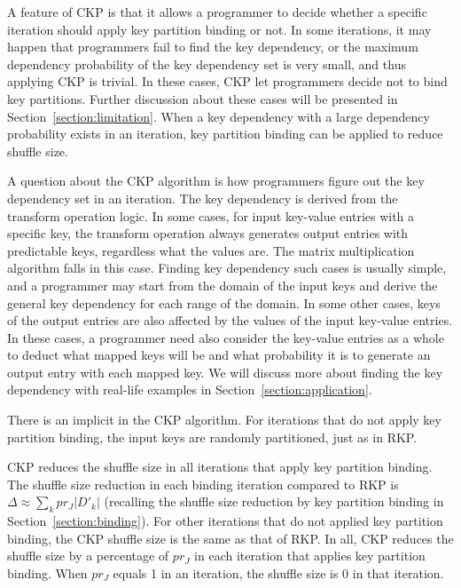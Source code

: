 \documentclass[10pt,journal,compsoc]{IEEEtran}
\begin{document}
A feature of CKP is that it allows a programmer to decide whether a specific iteration should apply key partition binding or not. 
In some iterations, it may happen that programmers fail to find the key dependency, 
or the maximum dependency probability of the key dependency set is very small, 
and thus applying CKP is trivial. 
In these cases, CKP let programmers decide not to bind key partitions. 
Further discussion about these cases will be presented in Section~\ref{section:limitation}.
When a key dependency with a large dependency probability exists in an iteration, key partition binding can be applied to reduce shuffle size.

A question about the CKP algorithm is how programmers figure out the key dependency set in an iteration. 
The key dependency is  derived from the transform operation logic. 
In some cases, for input key-value entries with a specific key, 
the transform operation always generates output entries with predictable keys, 
regardless what the values are. 
The matrix multiplication algorithm falls in this case. 
Finding key dependency such cases is usually simple, 
and a programmer may start from the domain of the input keys and 
derive the general key dependency for each range of the domain.
In some other cases, keys of the output entries are also affected by 
the values of the input key-value entries. 
In these cases, a programmer need also consider the key-value entries as 
a whole to deduct what mapped keys will be and what probability it is
to generate an output entry with each mapped key.
We will discuss more about finding the key dependency with real-life examples in Section~\ref{section:application}.

There is an implicit in the CKP algorithm. 
For iterations that do not apply key partition binding, 
the input keys are randomly partitioned, just as in RKP.

CKP reduces the shuffle size in all iterations that apply key partition binding.
The shuffle size reduction in each binding iteration compared to RKP is $ \Delta \approx \sum_k pr_J |D'_k|$ (recalling the shuffle size reduction by 
key partition binding in Section~\ref{section:binding}). 
For other iterations that do not applied key partition binding, 
the CKP shuffle size is the same as that of RKP.
In all, CKP reduces the shuffle size by a percentage of $pr_J$ in each 
iteration that applies key partition binding. 
When $pr_J$ equals 1 in an iteration, the shuffle size is 0 in that iteration.
\end{document}
